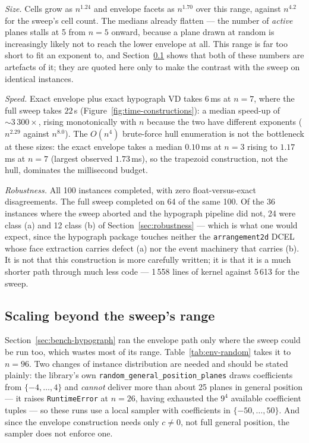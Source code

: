 \documentclass[11pt]{article}
\begin{document}
\emph{Size.} Cells grow as $n^{1.24}$ and envelope facets as $n^{1.70}$ over
this range, against $n^{4.2}$ for the sweep's cell count.  The medians already
flatten --- the number of \emph{active} planes stalls at 5 from $n = 5$ onward,
because a plane drawn at random is increasingly likely not to reach the lower
envelope at all.  This range is far too short to fit an exponent to, and
Section~\ref{sec:bench-env-scaling} shows that both of these numbers are
artefacts of it; they are quoted here only to make the contrast with the sweep
on identical instances.

\emph{Speed.} Exact envelope plus exact hypograph VD takes $6$\,ms at $n = 7$,
where the full sweep takes $22$\,s (Figure~\ref{fig:time-constructions}): a
median speed-up of ${\sim}3\,300\times$,
rising monotonically with $n$ because the two have different exponents
($n^{2.29}$ against $n^{8.0}$).  The $O(n^4)$ brute-force hull enumeration is
not the bottleneck at these sizes: the exact envelope takes a median
$0.10$\,ms at $n = 3$ rising to $1.17$\,ms at $n = 7$ (largest observed
$1.73$\,ms), so the trapezoid construction, not the hull, dominates the
millisecond budget.

\emph{Robustness.} All 100 instances completed, with zero float-versus-exact
disagreements.  The full sweep completed on 64 of the same 100.  Of the 36
instances where the sweep aborted and the hypograph pipeline did not, 24 were
class (a) and 12 class (b) of Section~\ref{sec:robustness} --- which is what one
would expect, since the hypograph package touches neither the
\texttt{arrangement2d} DCEL whose face extraction carries defect (a) nor the
event machinery that carries (b).  It is not that this construction is more
carefully written; it is that it is a much shorter path through much less code
--- 1\,558 lines of kernel against 5\,613 for the sweep.

\subsection{Scaling beyond the sweep's range}
\label{sec:bench-env-scaling}

Section~\ref{sec:bench-hypograph} ran the envelope path only where the sweep
could be run too, which wastes most of its range.  Table~\ref{tab:env-random}
takes it to $n = 96$.  Two changes of instance distribution are needed and
should be stated plainly: the library's own
\texttt{random\_general\_position\_planes} draws coefficients from
$\{-4,\dots,4\}$ and \emph{cannot} deliver more than about 25 planes in general
position --- it raises \texttt{RuntimeError} at $n = 26$, having exhausted the
$9^4$ available coefficient tuples --- so these runs use a local sampler with
coefficients in $\{-50,\dots,50\}$.  And since the envelope construction needs
only $c \neq 0$, not full general position, the sampler does not enforce one.
\end{document}
